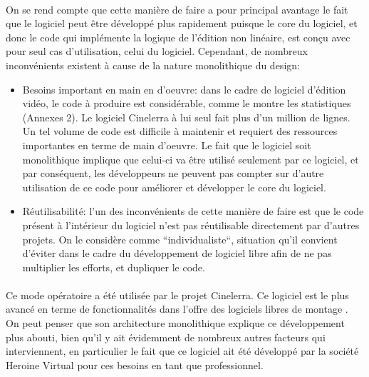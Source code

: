 \paragraph{}

On se rend compte que cette manière de faire a pour principal avantage
le fait que le logiciel peut être développé plus rapidement puisque
le core du logiciel, et donc le code qui implémente la logique de
l'édition non linéaire, est conçu avec pour seul cas d'utilisation,
celui du logiciel. Cependant, de nombreux inconvénients existent à
cause de la nature monolithique du design:

\begin{itemize}

  \item  {Besoins important en main en d'oeuvre: dans le cadre de logiciel
    d'édition vidéo, le code à produire est considérable, comme
    le montre les statistiques (Annexes 2). Le logiciel Cinelerra
    à lui seul fait plus d'un million de lignes. Un tel volume
    de code est difficile à maintenir et requiert des ressources
    importantes en terme de main d'oeuvre. Le fait que le logiciel
    soit monolithique implique que celui-ci va
    être utilisé seulement par ce logiciel, et par conséquent, les
    développeurs ne peuvent pas compter sur d'autre utilisation de ce
    code pour améliorer et développer le core du logiciel.}

  \item  {Réutilisabilité: l'un des inconvénients de cette manière
  de faire est que le code
    présent à l'intérieur du logiciel n'est pas réutilisable
    directement par d'autres projets. On le considère comme
    ``individualiste``, situation qu'il convient d'éviter dans le cadre
    du développement de logiciel libre afin de ne pas multiplier les
    efforts, et dupliquer le code.}

\end{itemize}

\paragraph{}

Ce mode opératoire a été utilisée par le projet Cinelerra. Ce
logiciel est le plus avancé en terme de fonctionnalités dans l'offre
des logiciels libres de montage . On peut penser que son architecture
monolithique explique ce développement plus
abouti, bien qu'il y ait évidemment de nombreux autres facteurs
qui interviennent, en particulier le fait que ce logiciel ait été
développé par la société Heroine Virtual pour ces besoins en tant
que professionnel.

